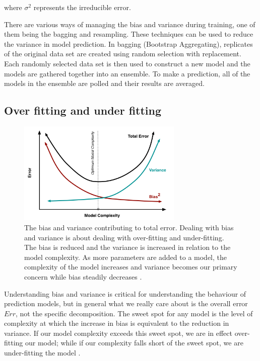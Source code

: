 where $\sigma^2$ represents the irreducible error. 

There are various ways of managing the bias and variance during training, one of them being the bagging  and resampling. These techniques can be used to reduce the variance in model prediction. In bagging (Bootstrap Aggregating), replicates of the original data set are created using random selection with replacement. Each randomly selected data set is then used to construct a new model and the models are gathered together into an ensemble. To make a prediction, all of the models in the ensemble are polled and their results are averaged.

\subsection{Over fitting and under fitting}

\begin{figure}[H]
  \centering
    \includegraphics[width=0.7\textwidth]{images/biasvariance.png}
    \caption{The bias and variance contributing to total error. Dealing with bias and variance is about dealing with over-fitting and under-fitting. The bias is reduced and the variance is increased in relation to the model complexity. As more parameters are added to a model, the complexity of the model increases and variance becomes our primary concern while bias steadily decreases \citep{fortmann2012understanding}.}  
\end{figure}

Understanding bias and variance is critical for understanding the behaviour of prediction models, but in general what we really care about is the overall error $Err$, not the specific decomposition. The sweet spot for any model is the level of complexity at which the increase in bias is equivalent to the reduction in variance. If our model complexity exceeds this sweet spot, we are in effect over-fitting our model; while if our complexity falls short of the sweet spot, we are under-fitting the model \citep{fortmann2012understanding}.









